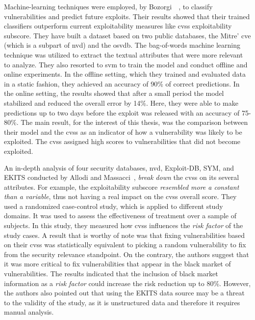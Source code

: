 Machine-learning techniques were employed, by Bozorgi~\etal{}~\cite{Bozorgi:2010}, to classify vulnerabilities and predict future exploits.
Their results showed that their trained classifiers outperform current exploitability measures like \gls{cvss} exploitability subscore.
They have built a dataset based on two public databases, the Mitre' \gls{cve} (which is a subpart of \gls{nvd}) and the \gls{osvdb}.
The bag-of-words machine learning technique was utilized to extract the textual attributes that were more relevant to analyze.
They also resorted to \gls{svm} to train the model and conduct offline and online experiments.
In the offline setting, which they trained and evaluated data in a static fashion, they achieved an accuracy of 90\% of correct predictions.
In the online setting, the results showed that after a small period the model stabilized and reduced the overall error by 14\%.
Here, they were able to make predictions up to two days before the exploit was released with an accuracy of 75-80\%.
The main result, for the interest of this thesis, was the comparison between their model and the \gls{cvss} as an indicator of how a vulnerability was likely to be exploited.
The \gls{cvss} assigned high scores to vulnerabilities that did not become exploited. 


An in-depth analysis of four security databases, \gls{nvd}, Exploit-DB, SYM, and EKITS conducted by Allodi and Massacci~\cite{Allodi:2014}, \emph{break down} the \gls{cvss} on its several attributes.
For example, the exploitability subscore \emph{resembled more a constant than a variable}, thus not having a real impact on the \gls{cvss} overall score.
They used a randomized case-control study, which is applied to different study domains.
It was used to assess the effectiveness of treatment over a sample of subjects.
In this study, they measured how \gls{cvss} influences the \emph{risk factor} of the study cases.
A result that is worthy of note was that fixing vulnerabilities based on their \gls{cvss} was statistically equivalent to picking a random vulnerability to fix from the security relevance standpoint.
On the contrary, the authors suggest that it was more critical to fix vulnerabilities that appear in the black market of vulnerabilities.
The results indicated that the inclusion of black market information as a \emph{risk factor} could increase the risk reduction up to 80\%.
However, the authors also pointed out that using the EKITS data source may be a threat to the validity of the study, as it is unstructured data and therefore it requires manual analysis.


